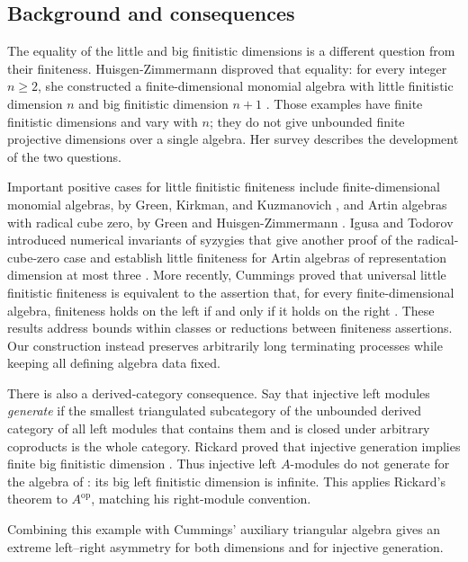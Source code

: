 \subsection{Background and consequences}

The equality of the little and big finitistic dimensions is a different
question from their finiteness. Huisgen-Zimmermann disproved that equality:
for every integer \(n\ge2\), she constructed a finite-dimensional monomial
algebra with little finitistic dimension \(n\) and big finitistic dimension
\(n+1\) \cite{HuisgenZimmermann1992}. Those examples have finite finitistic
dimensions and vary with \(n\); they do not give unbounded finite projective
dimensions over a single algebra. Her survey \cite{HuisgenZimmermann1995}
describes the development of the two questions.

Important positive cases for little finitistic finiteness include
finite-dimensional monomial algebras,
by Green, Kirkman, and Kuzmanovich \cite{GreenKirkmanKuzmanovich1991},
and Artin algebras with radical cube zero, by Green and
Huisgen-Zimmermann \cite{GreenHuisgenZimmermann1991}.
Igusa and Todorov introduced numerical invariants of syzygies that give
another proof of the radical-cube-zero case and establish little
finiteness for Artin algebras of representation dimension at most three
\cite[Corollaries~7 and~9]{IgusaTodorov2005}.
More recently, Cummings proved that universal little finitistic
finiteness is equivalent to the assertion that, for every
finite-dimensional algebra, finiteness holds on the left if and only
if it holds on the right \cite[Theorem~A]{Cummings2024}.
These results address bounds within classes or reductions between
finiteness assertions. Our construction instead preserves arbitrarily
long terminating processes while keeping all defining algebra data fixed.

There is also a derived-category consequence. Say that injective left
modules \emph{generate} if the smallest triangulated subcategory of the
unbounded derived category of all left modules that contains them and is
closed under arbitrary coproducts is the whole category. Rickard proved
that injective generation implies finite big finitistic dimension
\cite[Theorem~4.3]{Rickard2019}. Thus injective left \(A\)-modules do not
generate for the algebra of : its big left finitistic
dimension is infinite. This applies Rickard's theorem to
\(A^{\mathrm{op}}\), matching his right-module convention.

Combining this example with Cummings' auxiliary triangular algebra gives
an extreme left--right asymmetry for both dimensions and for injective
generation.

